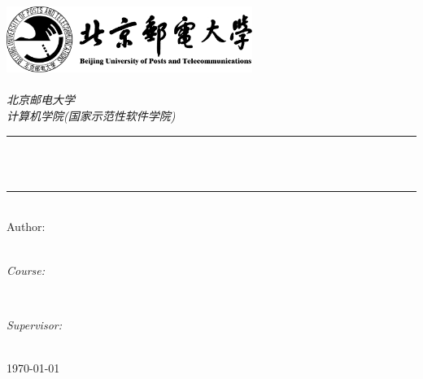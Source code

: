 \setlength{\parskip}{0.5em}

\begin{titlepage}
	\newcommand{\HRule}{\rule{\linewidth}{0.5mm}}
	\includegraphics[width=8cm]{title/logo.png}\\[1cm] 
	\center 
	\quad\\[1.5cm]
	\textsl{\Large 北京邮电大学 }\\[0.5cm] 
	\textsl{\large 计算机学院(国家示范性软件学院)}\\[0.5cm] 
	\makeatletter

	\HRule \\[0.4cm]
	{ \huge \bfseries \@title}\\[0cm] 
	\HRule \\[1.5cm]

	\large Author:\\[0.5cm]
	\large \emph{\@author}\\[3cm]

	\vfill 
	\begin{minipage}{0.4\textwidth}
		\begin{flushleft} \large
			\emph{Course:}\\
			\Course
		\end{flushleft}
	\end{minipage}
	~
	\begin{minipage}{0.4\textwidth}
		\begin{flushright} \large
			\emph{Supervisor:} \\
			\Supervisor
		\end{flushright}
	\end{minipage}\\[1.5cm]

	\large \today\\[2cm] 
\end{titlepage}
